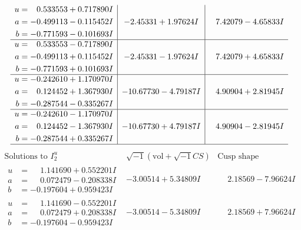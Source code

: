 \documentclass[1p]{elsarticle_modified}
\theoremstyle{definition}
\newcommand{\I}{\sqrt{-1}}
\begin{document}
$$\begin{array}{c|c|c}
\begin{aligned}
u &= \phantom{-}0.533553 + 0.717890 I \\
a &= -0.499113 - 0.115452 I \\
b &= -0.771593 - 0.101693 I\end{aligned}
 & -2.45331 + 1.97624 I & \phantom{-}7.42079 - 4.65833 I \\ \hline\begin{aligned}
u &= \phantom{-}0.533553 - 0.717890 I \\
a &= -0.499113 + 0.115452 I \\
b &= -0.771593 + 0.101693 I\end{aligned}
 & -2.45331 - 1.97624 I & \phantom{-}7.42079 + 4.65833 I \\ \hline\begin{aligned}
u &= -0.242610 + 1.170970 I \\
a &= \phantom{-}0.124452 + 1.367930 I \\
b &= -0.287544 - 0.335267 I\end{aligned}
 & -10.67730 - 4.79187 I & \phantom{-}4.90904 + 2.81945 I \\ \hline\begin{aligned}
u &= -0.242610 - 1.170970 I \\
a &= \phantom{-}0.124452 - 1.367930 I \\
b &= -0.287544 + 0.335267 I\end{aligned}
 & -10.67730 + 4.79187 I & \phantom{-}4.90904 - 2.81945 I\\
 \hline 
 \end{array}$$\newpage$$\begin{array}{c|c|c}  
\text{Solutions to }I^u_{2}& \I (\text{vol} + \sqrt{-1}CS) & \text{Cusp shape}\\
 \hline 
\begin{aligned}
u &= \phantom{-}1.141690 + 0.552201 I \\
a &= \phantom{-}0.072479 - 0.208338 I \\
b &= -0.197604 + 0.959423 I\end{aligned}
 & -3.00514 + 5.34809 I & \phantom{-}2.18569 - 7.96624 I \\ \hline\begin{aligned}
u &= \phantom{-}1.141690 - 0.552201 I \\
a &= \phantom{-}0.072479 + 0.208338 I \\
b &= -0.197604 - 0.959423 I\end{aligned}
 & -3.00514 - 5.34809 I & \phantom{-}2.18569 + 7.96624 I \\ \hline\begin{aligned}

\end{aligned}
\end{array}$$
\end{document}

